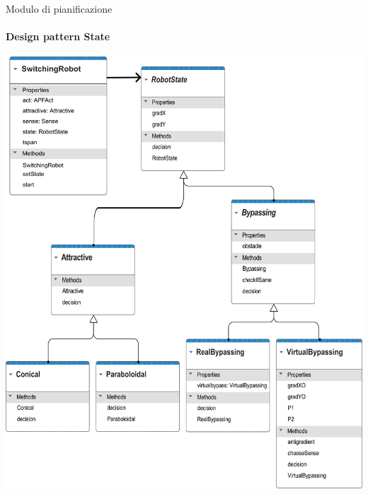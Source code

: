 \documentclass[handout]{beamer}
\begin{document}
\begin{frame}{Modulo di pianificazione}
\framesubtitle{Design pattern State}
\centering
\hspace{2cm}
\includegraphics[scale=1.07]{pianificazioneclass.png}
\end{frame}
\end{document}
